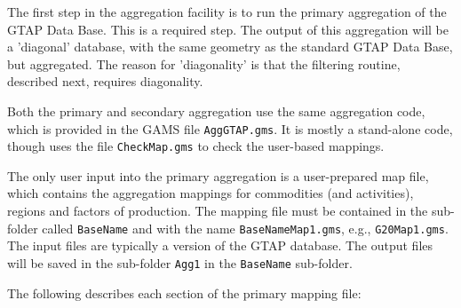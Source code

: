 The first step in the aggregation facility is to run the primary aggregation of
the GTAP Data Base. This is a required step. The output of this aggregation
will be a 'diagonal' database, with the same geometry as the standard
GTAP Data Base, but aggregated. The reason for 'diagonality' is that the
filtering routine, described next, requires diagonality.

Both the primary and secondary aggregation use the same aggregation code,
which is provided in the GAMS file \texttt{AggGTAP.gms}. It is mostly
a stand-alone code, though uses the file \texttt{CheckMap.gms} to
check the user-based mappings.

The only user input into the primary aggregation is a user-prepared map
file, which contains the aggregation mappings for commodities (and activities),
regions and factors of production. The mapping file must be contained
in the sub-folder called \texttt{BaseName} and with the
name \texttt{BaseNameMap1.gms}, e.g., \texttt{G20Map1.gms}. The input
files are typically a version of the GTAP database. The output
files will be saved in the sub-folder \texttt{Agg1} in the
\texttt{BaseName} sub-folder.

The following describes each section of the primary mapping file:

